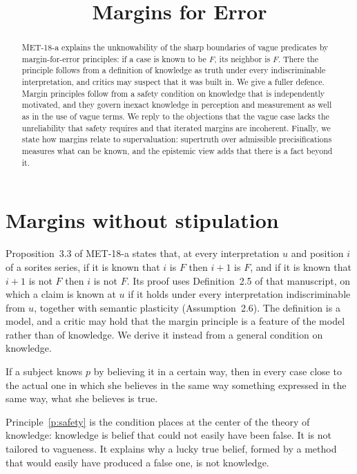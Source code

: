 \documentclass{situationist-preprint}
\title{Margins for Error}
\begin{document}
\maketitle

\begin{abstract}
MET-18-a explains the unknowability of the sharp boundaries of vague predicates by margin-for-error principles: if a case is known to be $F$, its neighbor is $F$. There the principle follows from a definition of knowledge as truth under every indiscriminable interpretation, and critics may suspect that it was built in. We give a fuller defence. Margin principles follow from a safety condition on knowledge that is independently motivated, and they govern inexact knowledge in perception and measurement as well as in the use of vague terms. We reply to the objections that the vague case lacks the unreliability that safety requires and that iterated margins are incoherent. Finally, we state how margins relate to supervaluation: supertruth over admissible precisifications measures what can be known, and the epistemic view adds that there is a fact beyond it.
\end{abstract}

\section{Margins without stipulation}\label{s:safety}

Proposition~3.3 of MET-18-a states that, at every interpretation $u$ and position $i$ of a sorites series, if it is known that $i$ is $F$ then $i+1$ is $F$, and if it is known that $i+1$ is not $F$ then $i$ is not $F$. Its proof uses Definition~2.5 of that manuscript, on which a claim is known at $u$ if it holds under every interpretation indiscriminable from $u$, together with semantic plasticity (Assumption~2.6). The definition is a model, and a critic may hold that the margin principle is a feature of the model rather than of knowledge. We derive it instead from a general condition on knowledge.

\begin{principle}[Safety]\label{p:safety}
If a subject knows $p$ by believing it in a certain way, then in every case close to the actual one in which she believes in the same way something expressed in the same way, what she believes is true.
\end{principle}

Principle~\ref{p:safety} is the condition \citet{Williamson2000} places at the center of the theory of knowledge: knowledge is belief that could not easily have been false. It is not tailored to vagueness. It explains why a lucky true belief, formed by a method that would easily have produced a false one, is not knowledge.
\end{document}
